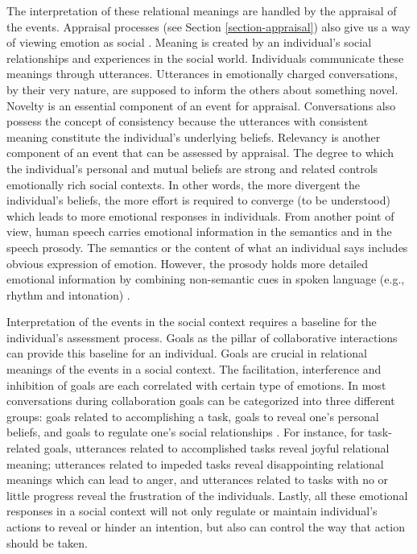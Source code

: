 \documentclass[12pt]{report}
\begin{document}
The interpretation of these relational meanings are handled by the appraisal of
the events. Appraisal processes (see Section \ref{section-appraisal}) also give
us a way of viewing emotion as social \cite{hooft:sharing-emotions}. Meaning is
created by an individual's social relationships and experiences in the social
world. Individuals communicate these meanings through utterances. Utterances in
emotionally charged conversations, by their very nature, are supposed to inform
the others about something novel. Novelty is an essential component of an event
for appraisal. Conversations also possess the concept of consistency because the
utterances with consistent meaning constitute the individual's underlying
beliefs. Relevancy is another component of an event that can be assessed by
appraisal. The degree to which the individual's personal and mutual beliefs are
strong and related controls emotionally rich social contexts. In other words,
the more divergent the individual's beliefs, the more effort is required to
converge (to be understood) which leads to more emotional responses in
individuals. From another point of view, human speech carries emotional
information in the semantics and in the speech prosody. The semantics or the
content of what an individual says includes obvious expression of emotion.
However, the prosody holds more detailed emotional information by combining
non-semantic cues in spoken language (e.g., rhythm and intonation)
\cite{luneski:emotion-aware-interaction}.

Interpretation of the events in the social context requires a baseline for the
individual's assessment process. Goals as the pillar of collaborative
interactions can provide this baseline for an individual. Goals are crucial in
relational meanings of the events in a social context. The facilitation,
interference and inhibition of goals are each correlated with certain type of
emotions. In most conversations during collaboration goals can be categorized
into three different groups: goals related to accomplishing a task, goals to
reveal one's personal beliefs, and goals to regulate one's social relationships
\cite{planalp:communicating-emotion}. For instance, for task-related goals,
utterances related to accomplished tasks reveal joyful relational meaning;
utterances related to impeded tasks reveal disappointing relational meanings
which can lead to anger, and utterances related to tasks with no or little
progress reveal the frustration of the individuals. Lastly, all these emotional
responses in a social context will not only regulate or maintain individual's
actions to reveal or hinder an intention, but also can control the way that
action should be taken.
\end{document}
